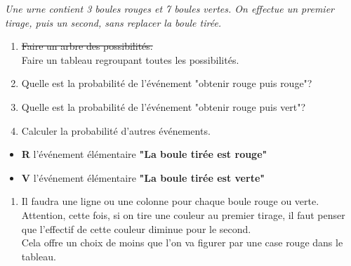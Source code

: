 \begin{exemple*1}

    \textit{Une urne contient 3 boules rouges et 7 boules vertes. On effectue un premier tirage, puis un second, sans replacer la boule tirée.}
    \begin{enumerate}
        \item \sout{Faire un arbre des possibilités.}\\ Faire un tableau regroupant toutes les possibilités.
        \item Quelle est la probabilité de l'événement "obtenir rouge puis rouge"?
        \item Quelle est la probabilité de l'événement "obtenir rouge puis vert"?
        \item Calculer la probabilité d'autres événements.
    \end{enumerate}
    \begin{itemize}
        \item \textbf{R} l’événement élémentaire \textbf{"La boule tirée est rouge"}
        \item \textbf{V} l’événement élémentaire \textbf{"La boule tirée est verte"}
    \end{itemize}    
    \correction
    \begin{enumerate}
        \item Il faudra une ligne ou une colonne pour chaque boule rouge ou verte.\\
        Attention, cette fois, si on tire une couleur au premier tirage, il faut penser que l'effectif de cette couleur diminue pour le second.\\
        Cela offre un choix de moins que l'on va figurer par une case rouge dans le tableau.


\end{enumerate}
\end{exemple*1}
